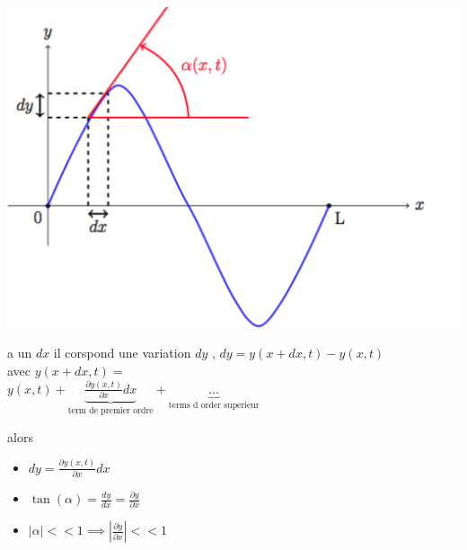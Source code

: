 \documentclass[12pt]{book}
\begin{document}
            \begin{center}
                \begin{minipage}{0,3\linewidth}
                    \includegraphics[width=\linewidth]{pic/modelisationdondescordevibrant.png}
                \end{minipage}
                \begin{minipage}{0,59\linewidth}
                    a un $dx$ il corspond une variation $dy$ , $dy =y(x+dx,t)-y(x,t)$ \\ avec $y(x+dx,t) = $\\$ y(x,t)+\underbrace{\frac{\partial y(x,t)}{\partial x}dx}_{\text{term de premier ordre}} + \underbrace{\ldots}_{\text{terms d order superieur}}$
                \end{minipage}
            \end{center}
            alors \begin{itemize}
                \item $dy =\frac{\partial y(x,t)}{\partial x}dx $
                \item $\tan(\alpha) = \frac{dy}{dx}=\frac{\partial y}{\partial x}$
                \item $ |\alpha| << 1 \implies |\frac{\partial y}{\partial x}|<<1 $
            \end{itemize}
\end{document}
